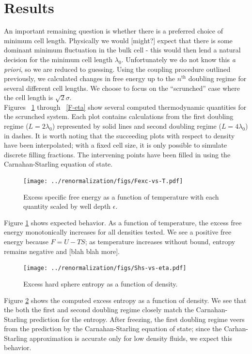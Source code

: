 \documentclass[12pt]{article}
\newcommand{\ignore}[1]{}
\begin{document}
\section{Results}
An important remaining question is whether there is a preferred choice of minimum cell length. Physically we would [might?] expect that there is some dominant minimum fluctuation in the bulk cell - this would then lend a natural decision for the minimum cell length $\lambda_0$. Unfortunately we do not know this {\it a priori}, so we are reduced to guessing. Using the coupling procedure outlined previously, we calculated changes in free energy up to the $n^{\text{th}}$ doubling regime for several different cell lengths. We choose to focus on the ``scrunched'' case where the cell length is $\sqrt2\sigma$.\\

Figures ~\ref{F-T} through ~\ref{F-eta} show several computed thermodynamic quantities for the scrunched system. Each plot contains calculations from the first doubling regime ($L=2\lambda_0$) represented by solid lines and second doubling regime ($L = 4\lambda_0$) in dashes. It is worth noting that the succeeding plots with respect to density have been interpolated; with a fixed cell size, it is only possible to simulate discrete filling fractions. The intervening points have been filled in using the Carnahan-Starling equation of state.\\  
\begin{figure}  
\centering
    \texttt{[image: ../renormalization/figs/Fexc-vs-T.pdf]}
    \caption{Excess specific free energy as a function of temperature with each quantity scaled by well depth $\epsilon$. }
    \label{F-T}
\end{figure}

Figure \ref{F-T} shows expected behavior. As a function of temperature, the excess free energy monotonically increases for all densities tested. We see a positive free energy because $F = U -TS$; as temperature increases without bound, entropy remains negative and [blah blah more].\\

\begin{figure}
\centering
    \texttt{[image: ../renormalization/figs/Shs-vs-eta.pdf]}
    \caption{Excess hard sphere entropy as a function of density.}
    \label{Shs-eta}
\end{figure}
\ignore{Filling fraction or density? Value in distinction? We never use number density for the sake of units...}
Figure \ref{Shs-eta} shows the computed excess entropy as a function of density. We see that the both the first and second doubling regime closely match the Carnahan-Starling prediction for the entropy. After freezing, the first doubling regime veers from the prediction by the Carnahan-Starling equation of state; since the Carhan-Starling approximation is accurate only for low density fluids, we expect this behavior.\\
\end{document}

